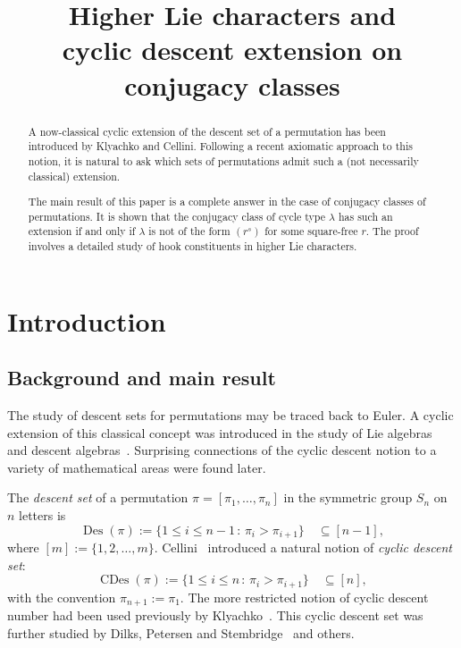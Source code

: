 \documentclass[ALCO,published]{cedram}
\title
[Higher Lie Characters and Cyclic Descents on Conjugacy Classes]
{Higher Lie characters and\\ cyclic descent extension on conjugacy classes}
\author[\initial{R.} \middlename{M.} Adin]{\firstname{Ron} \middlename{M.} \lastname{Adin}}
\author[\initial{P.} Heged\"us]{\firstname{P\'al} \lastname{Heged\"us}}
\author[\initial{Y.} Roichman]{\firstname{Yuval} \lastname{Roichman}}
\newcommand{\symm}{S}
\DeclareMathOperator\Des{Des}
\DeclareMathOperator\CDes{CDes}
\begin{document}
\newtheorem{observation}[cdrthm]{Observation}
\newtheorem{problem}[cdrthm]{Problem}

\begin{abstract}
    A now-classical cyclic extension of the descent set of a permutation has been introduced by Klyachko and Cellini.
    Following a recent axiomatic approach to this notion, it is natural to ask which sets of permutations admit such a (not necessarily classical) extension.

    The main result of this paper is
    a complete answer in the case of conjugacy classes of permutations.
    It is shown that the conjugacy class of cycle type $\lambda$ has such an extension if and only if 
    $\lambda$ is not of the form $(r^s)$ for some square-free $r$.
    The proof involves a detailed study of hook constituents in higher Lie characters.
\end{abstract}

\maketitle

	
\section{Introduction}

\subsection{Background and main result}

The study of descent sets for permutations may be traced back to Euler. 
A cyclic extension of this classical concept was introduced in the study of
Lie algebras~\cite{Klyachko} and descent algebras~\cite{Cellini}. Surprising connections of the cyclic descent
notion to a variety of mathematical areas were found later.
	
The {\em descent set} of a permutation $\pi = [\pi_1, \ldots, \pi_n]$ in the symmetric group $\symm_n$ on $n$ letters is
\[
    \Des(\pi) := \{1 \le i \le n-1 \,:\, \pi_i > \pi_{i+1} \}
    \quad \subseteq [n-1],
\]
where $[m]:=\{1,2,\ldots,m\}$.  
Cellini~\cite{Cellini} introduced a natural notion of {\em cyclic descent set}: 
\[
    \CDes(\pi) := \{1 \leq i \leq n \,:\, \pi_i > \pi_{i+1} \}
    \quad \subseteq [n],
\]
with the convention $\pi_{n+1}:=\pi_1$.  
The more restricted notion of cyclic descent number had been used previously by Klyachko~\cite{Klyachko}.
This cyclic descent set was further studied by Dilks, Petersen and Stembridge~\cite{DPS} and others.
	
\end{document}
